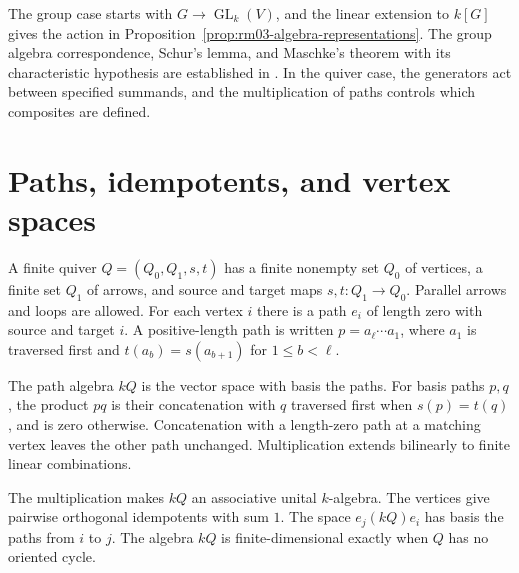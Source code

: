 The group case starts with \(G\to\operatorname{GL}_k(V)\), and the
linear extension to \(k[G]\) gives the action in
Proposition~\ref{prop:rm03-algebra-representations}. The group algebra
correspondence, Schur's lemma, and Maschke's theorem with its
characteristic hypothesis are established in
\cite[Ch.~8]{p103}. In the quiver case, the generators act between
specified summands, and the multiplication of paths controls which
composites are defined.

\section{Paths, idempotents, and vertex spaces}

\begin{definition}
\label{def:rm03-path-algebra}
A finite quiver \(Q=(Q_0,Q_1,s,t)\) has a finite nonempty set
\(Q_0\) of vertices, a finite set \(Q_1\) of arrows, and source and
target maps \(s,t\colon Q_1\to Q_0\). Parallel arrows and loops are
allowed. For each vertex \(i\) there is a path \(e_i\) of length zero
with source and target \(i\). A positive-length path is written
\(p=a_\ell\cdots a_1\), where \(a_1\) is traversed first and
\(t(a_b)=s(a_{b+1})\) for \(1\leq b<\ell\).

The path algebra \(kQ\) is the vector space with basis the paths.
For basis paths \(p,q\), the product \(pq\) is their concatenation
with \(q\) traversed first when \(s(p)=t(q)\), and is zero
otherwise. Concatenation with a length-zero path at a matching
vertex leaves the other path unchanged. Multiplication extends
bilinearly to finite linear combinations.
\end{definition}

\begin{lemma}
\label{lem:rm03-path-basis}
The multiplication makes \(kQ\) an associative unital \(k\)-algebra.
The vertices give pairwise orthogonal idempotents with sum \(1\).
The space \(e_j(kQ)e_i\) has basis the paths from \(i\) to \(j\).
The algebra \(kQ\) is finite-dimensional exactly when \(Q\) has no
oriented cycle.
\end{lemma}


